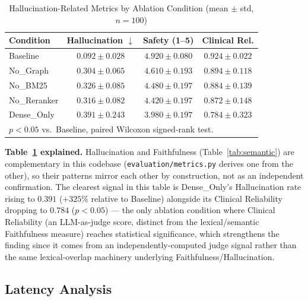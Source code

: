 \documentclass[conference]{IEEEtran}
\begin{document}
\begin{table}[t]
\centering
\caption{Hallucination-Related Metrics by Ablation Condition (mean $\pm$ std, $n=100$)}
\label{tab:hallucination}
\begin{tabular}{@{}lccc@{}}
\toprule
\textbf{Condition} & \textbf{Hallucination $\downarrow$} & \textbf{Safety (1--5)} & \textbf{Clinical Rel.} \\
\midrule
Baseline     & $0.092 \pm 0.028$ & $4.920 \pm 0.080$ & $0.924 \pm 0.022$ \\
No\_Graph    & $0.304 \pm 0.065$ & $4.610 \pm 0.193$ & $0.894 \pm 0.118$ \\
No\_BM25     & $0.326 \pm 0.085$\rlap{*} & $4.480 \pm 0.197$ & $0.884 \pm 0.139$ \\
No\_Reranker & $0.316 \pm 0.082$ & $4.420 \pm 0.197$ & $0.872 \pm 0.148$ \\
Dense\_Only  & $0.391 \pm 0.243$ & $3.980 \pm 0.197$ & $0.784 \pm 0.323$\rlap{*} \\
\bottomrule
\multicolumn{4}{l}{\footnotesize *$p<0.05$ vs.\ Baseline, paired Wilcoxon signed-rank test.}
\end{tabular}
\end{table}

\textbf{Table~\ref{tab:hallucination} explained.} Hallucination and Faithfulness (Table~\ref{tab:semantic}) are complementary in this codebase (\texttt{evaluation/metrics.py} derives one from the other), so their patterns mirror each other by construction, not as an independent confirmation. The clearest signal in this table is Dense\_Only's Hallucination rate rising to $0.391$ ($+325\%$ relative to Baseline) alongside its Clinical Reliability dropping to $0.784$ ($p<0.05$) --- the only ablation condition where Clinical Reliability (an LLM-as-judge score, distinct from the lexical/semantic Faithfulness measure) reaches statistical significance, which strengthens the finding since it comes from an independently-computed judge signal rather than the same lexical-overlap machinery underlying Faithfulness/Hallucination.

\subsection{Latency Analysis}
\end{document}
